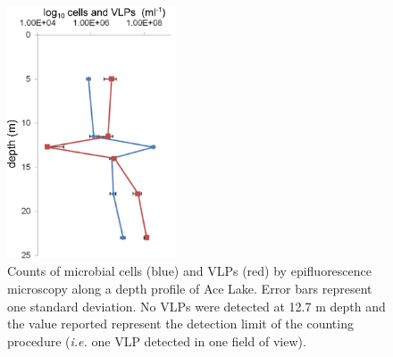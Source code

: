 \begin{figure}
\centering
\includegraphics[width=50mm]{ace_figures/ace_counts.pdf}
\caption[Counts of microbial cells and \acp{VLP} in Ace Lake]{Counts of microbial cells (blue) and \acp{VLP} (red) by epifluorescence microscopy along a depth profile of Ace Lake.
Error bars represent one standard deviation.
No \acp{VLP} were detected at 12.7 m depth and the value reported represent the detection limit of the counting procedure (\emph{i.e.} one \ac{VLP} detected in one field of view).
}
\label{fig:ace_counts}

\end{figure}
